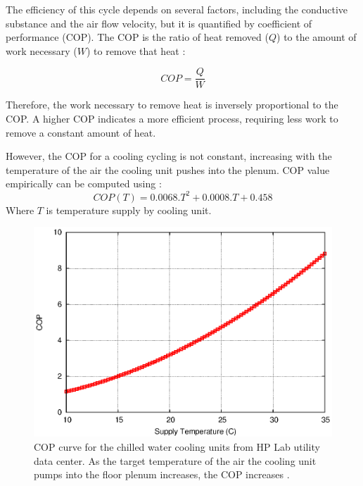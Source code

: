 \documentclass[conference]{IEEEtran}
\begin{document}
The efficiency of this cycle depends on several factors, including the conductive substance and the air flow velocity, but it is quantified by coefficient of performance (COP).
The COP is the ratio of heat removed ($Q$) to the amount of work necessary ($W$) to remove that heat  \cite{moore2005making}:

\begin{equation}\label{eqn:cop}
	COP=\frac{Q}{W}
\end{equation}

Therefore, the work necessary to remove heat is inversely proportional to the COP.  
A higher COP indicates a more efficient process, requiring less work to remove a constant amount of heat.

However, the COP for a cooling cycling is not constant, increasing with the temperature of the air the cooling unit pushes into the plenum.  
COP value empirically can be computed using \cite{moore2005making}:
\begin{equation}\label{eqn:copt}
	COP(T) = 0.0068.T^2 + 0.0008.T + 0.458
\end{equation}
Where $T$ is temperature supply by cooling unit.  

\begin{figure}[thb]
\begin{center}
\includegraphics[scale=0.6]{graphs/cop.eps}
\end{center}
\caption{COP curve for the chilled water cooling units from HP Lab utility data center.
As the target temperature of the air the cooling unit pumps into the floor plenum increases, the COP increases \cite{moore2005making}.}
\label{fig:twotier}
\end{figure} 
\end{document}
